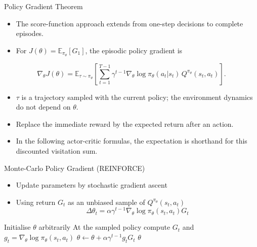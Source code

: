 \begin{frame}{Policy Gradient Theorem}
\begin{itemize}
\item The score-function approach extends from one-step decisions to complete episodes.
\item For $J(\theta)=\mathbb{E}_{\pi_\theta}[G_1]$, the episodic policy gradient is
\end{itemize}
\[ \nabla_\theta J(\theta)=\mathbb{E}_{\tau\sim\pi_\theta}\!\left[
\sum_{t=1}^{T-1}\gamma^{t-1}\nabla_\theta\log\pi_\theta(a_t|s_t)\,
Q^{\pi_\theta}(s_t,a_t)\right]. \]
\begin{itemize}
\item $\tau$ is a trajectory sampled with the current policy; the environment dynamics do not depend on $\theta$.
\item Replace the immediate reward by the expected return after an action.
\item In the following actor-critic formulas, the expectation is shorthand for this discounted visitation sum.
\end{itemize}
\end{frame}

\begin{frame}{Monte-Carlo Policy Gradient (REINFORCE)}
\small
\begin{itemize}
  \item Update parameters by stochastic gradient ascent
  \item Using return $G_t$ as an unbiased sample of $Q^{\pi_\theta}(s_t, a_t)$
  \[ \Delta\theta_t = \alpha \gamma^{t-1}\nabla_\theta \log \pi_\theta(s_t, a_t) G_t \]
\end{itemize}
\small
\begin{algorithmic}
  \State Initialise $\theta$ arbitrarily
    \State At the sampled policy compute $G_t$ and $g_t=\nabla_\theta\log\pi_\theta(s_t,a_t)$
      \State $\theta \leftarrow \theta + \alpha \gamma^{t-1}g_t G_t$
    \EndFor
  \EndFor
  \State \Return $\theta$
\EndFunction
\end{algorithmic}
\end{frame}

